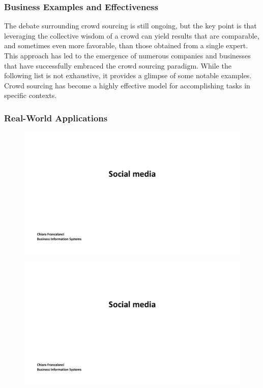 \subsubsection{Business Examples and
  Effectiveness}\label{business-examples-and-effectiveness}

The debate surrounding crowd sourcing is still ongoing, but the key
point is that leveraging the collective wisdom of a crowd can yield
results that are comparable, and sometimes even more favorable, than
those obtained from a single expert. This approach has led to the
emergence of numerous companies and businesses that have successfully
embraced the crowd sourcing paradigm. While the following list is not
exhaustive, it provides a glimpse of some notable examples. Crowd
sourcing has become a highly effective model for accomplishing tasks in
specific contexts.

\subsubsection{Real-World Applications}\label{real-world-applications}

\begin{figure}[!h]
  \centering
  \includegraphics[page=8, trim = 0cm 2cm 8cm 4cm, clip, width=\imagewidth]{images/04 - Social_Media.pdf}
\end{figure}

\begin{figure}[!h]
  \centering
  \includegraphics[page=9, trim = 1.5cm 2.5cm 1.5cm 3.5cm, clip, width=\imagewidth]{images/04 - Social_Media.pdf}
\end{figure}

